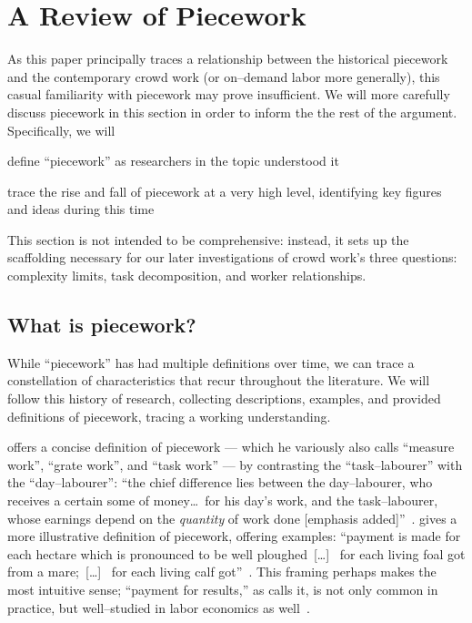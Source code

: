 \documentclass[trackingWork]{subfiles}
\begin{document}
\onlyinsubfile{\clearpage}
\section{A Review of Piecework}

As this paper principally traces a relationship between
the historical piecework and the contemporary crowd work
(or on--demand labor more generally),
this casual familiarity with piecework may prove insufficient.
We will more carefully discuss piecework in this section in order
to inform the the rest of the argument.
Specifically, we will
\begin{inlinelist}[itemjoin*={;~and~},itemjoin={;~}]
  \item define ``piecework'' as researchers in the topic understood it
  \item trace the rise and fall of piecework at a very high level,
        identifying key figures and ideas during this time
\end{inlinelist}
This section is not intended to be comprehensive: instead, it sets up the scaffolding necessary for our later investigations of crowd work's three questions: complexity limits, task decomposition, and worker relationships.

\subsection{What is piecework?}
While ``piecework'' has had multiple definitions over time,
we can trace a constellation of characteristics that recur throughout the literature.
We will follow this history of research, collecting
descriptions,
examples, and
provided definitions of piecework, tracing a working understanding.

\citeauthor{hughRaynbirdTaskWork} offers
a concise definition of piecework
--- which he variously also calls ``measure work'', ``grate work'', and ``task work'' ---
by contrasting the ``task--labourer'' with the ``day--labourer'':
``the chief difference lies between the day--labourer,
who receives a certain some of money\dots~for his day's work,
and the task--labourer, whose earnings depend on the \textit{quantity} of work done [emphasis added]''~\cite{hughRaynbirdTaskWork}.
\citeauthor{10.2307/2338394} gives a more illustrative definition of piecework,
offering examples:
``payment is made for each hectare which is pronounced to be well ploughed~[\dots]~
for each living foal got from a mare;~[\dots]~
for each living calf got''~\cite{10.2307/2338394}.
This framing perhaps makes the most intuitive sense;
``payment for results,'' as \citeauthor{10.2307/2338394} calls it,
is not only common in practice, but well--studied in labor economics as well~\cite{Figlio2007901,weitzman1976new,10.2307/3003414,BJIR:BJIR038}.
\end{document}
